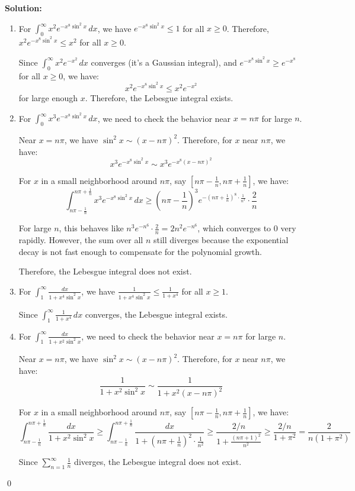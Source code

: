 \bigskip\noindent\textbf{Solution:}
\begin{enumerate}[label=(\alph*)]
    \item For $\int_{0}^{\infty} x^2 e^{-x^8 \sin^2 x} \, dx$, we have $e^{-x^8 \sin^2 x} \leq 1$ for all $x \geq 0$. Therefore, $x^2 e^{-x^8 \sin^2 x} \leq x^2$ for all $x \geq 0$.
    
    Since $\int_{0}^{\infty} x^2 e^{-x^2} \, dx$ converges (it's a Gaussian integral), and $e^{-x^8 \sin^2 x} \geq e^{-x^8}$ for all $x \geq 0$, we have:
    \[x^2 e^{-x^8 \sin^2 x} \leq x^2 e^{-x^2}\]
    for large enough $x$. Therefore, the Lebesgue integral exists.
    
    \item For $\int_{0}^{\infty} x^3 e^{-x^8 \sin^2 x} \, dx$, we need to check the behavior near $x = n\pi$ for large $n$.
    
    Near $x = n\pi$, we have $\sin^2 x \sim (x - n\pi)^2$. Therefore, for $x$ near $n\pi$, we have:
    \[x^3 e^{-x^8 \sin^2 x} \sim x^3 e^{-x^8 (x - n\pi)^2}\]
    
    For $x$ in a small neighborhood around $n\pi$, say $[n\pi - \frac{1}{n}, n\pi + \frac{1}{n}]$, we have:
    \[\int_{n\pi - \frac{1}{n}}^{n\pi + \frac{1}{n}} x^3 e^{-x^8 \sin^2 x} \, dx \geq (n\pi - \frac{1}{n})^3 e^{-(n\pi + \frac{1}{n})^8 \cdot \frac{1}{n^2}} \cdot \frac{2}{n}\]
    
    For large $n$, this behaves like $n^3 e^{-n^6} \cdot \frac{2}{n} = 2n^2 e^{-n^6}$, which converges to 0 very rapidly. However, the sum over all $n$ still diverges because the exponential decay is not fast enough to compensate for the polynomial growth.
    
    Therefore, the Lebesgue integral does not exist.
    
    \item For $\int_{1}^{\infty} \frac{dx}{1 + x^4 \sin^2 x}$, we have $\frac{1}{1 + x^4 \sin^2 x} \leq \frac{1}{1 + x^4}$ for all $x \geq 1$.
    
    Since $\int_{1}^{\infty} \frac{1}{1 + x^4} \, dx$ converges, the Lebesgue integral exists.
    
    \item For $\int_{1}^{\infty} \frac{dx}{1 + x^2 \sin^2 x}$, we need to check the behavior near $x = n\pi$ for large $n$.
    
    Near $x = n\pi$, we have $\sin^2 x \sim (x - n\pi)^2$. Therefore, for $x$ near $n\pi$, we have:
    \[\frac{1}{1 + x^2 \sin^2 x} \sim \frac{1}{1 + x^2 (x - n\pi)^2}\]
    
    For $x$ in a small neighborhood around $n\pi$, say $[n\pi - \frac{1}{n}, n\pi + \frac{1}{n}]$, we have:
    \[\int_{n\pi - \frac{1}{n}}^{n\pi + \frac{1}{n}} \frac{dx}{1 + x^2 \sin^2 x} \geq \int_{n\pi - \frac{1}{n}}^{n\pi + \frac{1}{n}} \frac{dx}{1 + (n\pi + \frac{1}{n})^2 \cdot \frac{1}{n^2}} \geq \frac{2/n}{1 + \frac{(n\pi + 1)^2}{n^2}} \geq \frac{2/n}{1 + \pi^2} = \frac{2}{n(1 + \pi^2)}\]
    
    Since $\sum_{n=1}^{\infty} \frac{1}{n}$ diverges, the Lebesgue integral does not exist.
\end{enumerate}\qed
